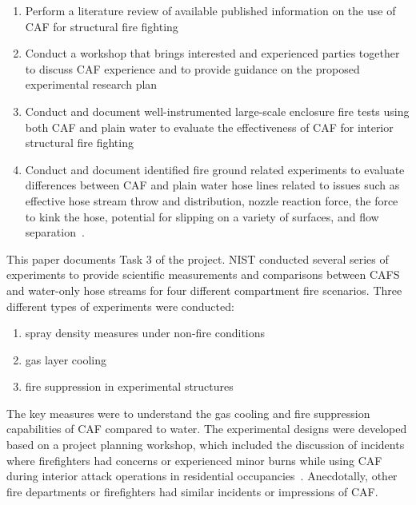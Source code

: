 \documentclass[12pt,oneside]{book}
\begin{document}
\begin{enumerate}
\item  Perform a literature review of available published information on the use of CAF for structural fire fighting~\cite{Mitchell:1}
\item  Conduct a workshop that brings interested and experienced parties together to discuss CAF experience and to provide guidance on the proposed experimental research plan~\cite{Grant:2011} 
\item  Conduct and document well-instrumented large-scale enclosure fire tests using both CAF and plain water to evaluate the effectiveness of CAF for interior structural fire fighting
\item  Conduct and document identified fire ground related experiments to evaluate differences between CAF and plain water hose lines related to issues such as effective hose stream throw and distribution, nozzle reaction force, the force to kink the hose, potential for slipping on a variety of surfaces, and flow separation~\cite{Carracino:2013,Dicus:2013,LaPolla:2012}. 
\end{enumerate}

This paper documents Task 3 of the project. NIST conducted several series of experiments to provide scientific measurements and comparisons between CAFS and water-only hose streams for four different compartment fire scenarios.  Three different types of experiments were conducted:
\begin{enumerate}
\item spray density measures under non-fire conditions
\item gas layer cooling
\item fire suppression in experimental structures
\end{enumerate}

The key measures were to understand the gas cooling and fire suppression capabilities of CAF compared to water. The experimental designs were developed based on a project planning workshop, which included the discussion of incidents where firefighters had concerns or experienced minor burns while using CAF during interior attack operations in residential occupancies~\cite{Grant:2011}. Anecdotally, other fire departments or firefighters had similar incidents or impressions of CAF.
\end{document}
